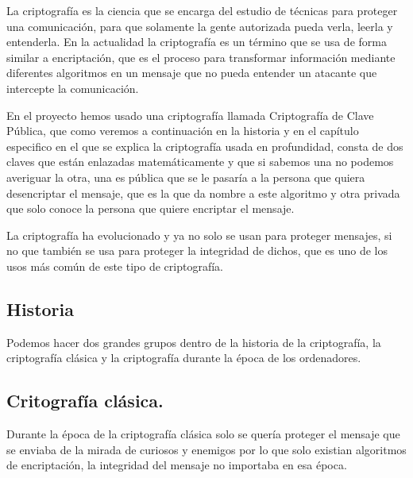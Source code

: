 La criptografía es la ciencia que se encarga del estudio de técnicas para proteger una comunicación, para que solamente la gente autorizada pueda verla, leerla y entenderla. En la actualidad la criptografía es un término que se usa de forma similar a encriptación, que es el proceso para transformar información mediante diferentes algoritmos en un mensaje que no pueda entender un atacante que intercepte la comunicación. 


En el proyecto hemos usado una criptografía llamada Criptografía de Clave Pública, que como veremos a continuación en la historia y en el capítulo especifico en el que se explica la criptografía usada en profundidad, consta de dos claves que están enlazadas matemáticamente y que si sabemos una no podemos averiguar la otra, una es pública que se le pasaría a la persona que quiera desencriptar el mensaje, que es la que da nombre a este algoritmo y otra privada que solo conoce la persona que quiere encriptar el mensaje.

La criptografía ha evolucionado y ya no solo se usan para proteger mensajes, si no que también se usa para proteger la integridad de dichos, que es uno de los usos más común de este tipo de criptografía.

\subsection{Historia}

Podemos hacer dos grandes grupos dentro de la historia de la criptografía, la criptografía clásica y la criptografía durante la época de los ordenadores.

\subsection{Critografía clásica.}

	Durante la época de la criptografía clásica solo se quería proteger el mensaje que se enviaba de la mirada de curiosos y enemigos por lo que solo existian algoritmos de encriptación, la integridad del mensaje no importaba en esa época.  
	
